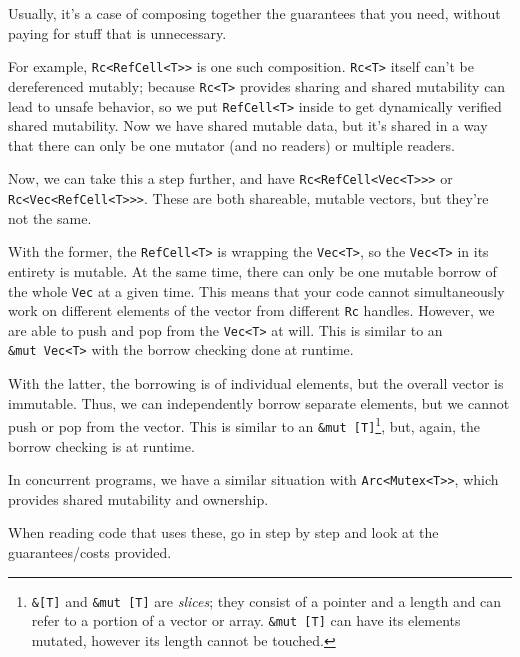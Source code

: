 \documentclass[a4paper,]{book}
\begin{document}
Usually, it's a case of composing together the guarantees that you need,
without paying for stuff that is unnecessary.

For example,
\texttt{Rc\textless{}RefCell\textless{}T\textgreater{}\textgreater{}} is
one such composition. \texttt{Rc\textless{}T\textgreater{}} itself can't
be dereferenced mutably; because \texttt{Rc\textless{}T\textgreater{}}
provides sharing and shared mutability can lead to unsafe behavior, so
we put \texttt{RefCell\textless{}T\textgreater{}} inside to get
dynamically verified shared mutability. Now we have shared mutable data,
but it's shared in a way that there can only be one mutator (and no
readers) or multiple readers.

Now, we can take this a step further, and have
\texttt{Rc\textless{}RefCell\textless{}Vec\textless{}T\textgreater{}\textgreater{}\textgreater{}}
or
\texttt{Rc\textless{}Vec\textless{}RefCell\textless{}T\textgreater{}\textgreater{}\textgreater{}}.
These are both shareable, mutable vectors, but they're not the same.

With the former, the \texttt{RefCell\textless{}T\textgreater{}} is
wrapping the \texttt{Vec\textless{}T\textgreater{}}, so the
\texttt{Vec\textless{}T\textgreater{}} in its entirety is mutable. At
the same time, there can only be one mutable borrow of the whole
\texttt{Vec} at a given time. This means that your code cannot
simultaneously work on different elements of the vector from different
\texttt{Rc} handles. However, we are able to push and pop from the
\texttt{Vec\textless{}T\textgreater{}} at will. This is similar to an
\texttt{\&mut\ Vec\textless{}T\textgreater{}} with the borrow checking
done at runtime.

With the latter, the borrowing is of individual elements, but the
overall vector is immutable. Thus, we can independently borrow separate
elements, but we cannot push or pop from the vector. This is similar to
an \texttt{\&mut\ {[}T{]}}\footnote{\texttt{\&{[}T{]}} and
  \texttt{\&mut\ {[}T{]}} are \emph{slices}; they consist of a pointer
  and a length and can refer to a portion of a vector or array.
  \texttt{\&mut\ {[}T{]}} can have its elements mutated, however its
  length cannot be touched.}, but, again, the borrow checking is at
runtime.

In concurrent programs, we have a similar situation with
\texttt{Arc\textless{}Mutex\textless{}T\textgreater{}\textgreater{}},
which provides shared mutability and ownership.

When reading code that uses these, go in step by step and look at the
guarantees/costs provided.
\end{document}

